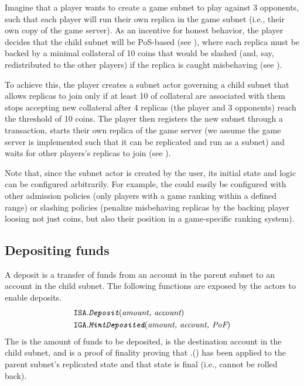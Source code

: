 \begin{example}
\label{ex:create-game-subnet}

Imagine that a player wants to create a game subnet to play against 3 opponents,
such that each player will run their own replica in the game subnet (i.e., their own copy of the game server).
As an incentive for honest behavior, the player decides that the child subnet will be PoS-based (see ),
where each replica must be backed by a minimal collateral of 10 coins that would be slashed (and, say, redistributed to the other players) if the replica is caught misbehaving (see ).

To achieve this, the player creates a subnet actor governing a child subnet that allows replicas to join only if at least 10 of collateral are associated with them
stops accepting new collateral after 4 replicas (the player and 3 opponents) reach the threshold of 10 coins.
The player then registers the new subnet through a  transaction, starts their own replica of the game server (we assume the game server is implemented such that it can be replicated and run as a subnet)
and waits for other players's replicas to join (see ).

Note that, since the subnet actor is created by the user, its initial state and logic can be configured arbitrarily.
For example, the \sa could easily be configured with other admission policies (only players with a game ranking within a defined range)
or slashing policies (penalize misbehaving replicas by the backing player loosing not just coins, but also their position in a game-specific ranking system).

\end{example}

\subsection{Depositing funds}
\label{sec:deposit}

A deposit is a transfer of funds from an account in the parent subnet to an account in the child subnet.
The following functions are exposed by the \ipc actors to enable deposits.
\begin{align*}
    \texttt{ISA}.&\textit{\texttt{Deposit}}(\textit{amount, account})\\
    \texttt{IGA}.&\textit{\texttt{MintDeposited}}(\textit{amount, account, \textit{PoF}})
\end{align*}
The  is the amount of funds to be deposited,  is the destination account in the child subnet, and \funcParam{\pof} is a proof of finality proving that \sa.() has been applied to the parent subnet's replicated state and that state is final (i.e., cannot be rolled back).

